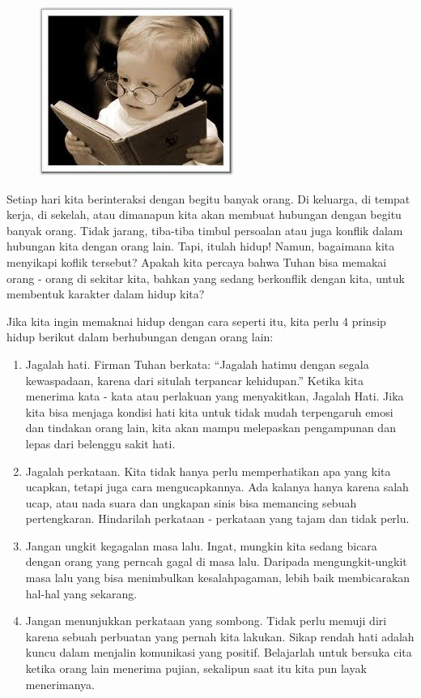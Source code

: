 \small
\begin{figure}
\includegraphics[scale=0.35]{gambar/child.png}
\end{figure}
Setiap hari kita berinteraksi dengan begitu banyak orang. Di keluarga, di tempat kerja, di sekelah, atau dimanapun kita akan membuat hubungan dengan begitu banyak orang. Tidak jarang, tiba-tiba timbul persoalan atau juga konflik dalam hubungan kita dengan orang lain. Tapi, itulah hidup! Namun, bagaimana kita menyikapi koflik tersebut?
Apakah kita percaya bahwa Tuhan bisa memakai orang - orang di sekitar kita, bahkan yang sedang berkonflik dengan kita, untuk membentuk karakter dalam hidup kita?

Jika kita ingin memaknai hidup dengan cara seperti itu, kita perlu 4 prinsip hidup berikut dalam berhubungan dengan orang lain:
\begin{enumerate}
\item Jagalah hati. Firman Tuhan berkata: ``Jagalah hatimu dengan segala kewaspadaan, karena dari situlah terpancar kehidupan.'' Ketika kita menerima kata - kata atau perlakuan yang menyakitkan, Jagalah Hati. Jika kita bisa menjaga kondisi hati kita untuk tidak mudah terpengaruh emosi dan tindakan orang lain, kita akan mampu melepaskan pengampunan dan lepas dari belenggu sakit hati.
\item Jagalah perkataan. Kita tidak hanya perlu memperhatikan apa yang kita ucapkan, tetapi juga cara mengucapkannya. Ada kalanya hanya karena salah ucap, atau nada suara dan ungkapan sinis bisa memancing sebuah pertengkaran. Hindarilah perkataan - perkataan yang tajam dan tidak perlu.
\item Jangan ungkit kegagalan masa lalu. Ingat, mungkin kita sedang bicara dengan orang yang perncah gagal di masa lalu. Daripada mengungkit-ungkit masa lalu yang bisa menimbulkan kesalahpagaman, lebih baik membicarakan hal-hal yang sekarang.
\item Jangan menunjukkan perkataan yang sombong. Tidak perlu memuji diri karena sebuah perbuatan yang pernah kita lakukan. Sikap rendah hati adalah kuncu dalam menjalin komunikasi yang positif. Belajarlah untuk bersuka cita ketika orang lain menerima pujian, sekalipun saat itu kita pun layak menerimanya.
\end{enumerate}

